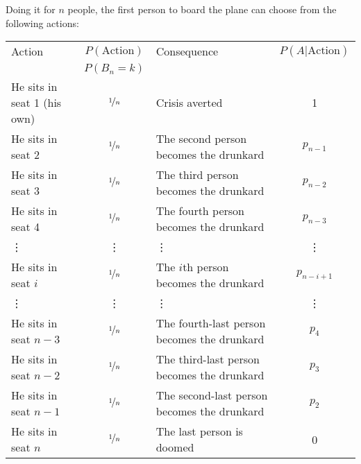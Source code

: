 \documentclass[a4paper]{article}
\begin{document}
Doing it for $n$ people, the first person to board the plane can choose from the following actions:
\begin{center}
\begin{tabular}{lclc}
\hline
 Action                    & $P(\text{Action})$ &  Consequence                             & $P(A|\text{Action})$ \\
                           & $P(B_n = k)$       &                                          &               \\
 \hline
He sits in seat 1 (his own)& $\nicefrac{1}{n}$  &  Crisis averted                          & 1\\
He sits in seat 2          & $\nicefrac{1}{n}$  &  The second person becomes the drunkard  & $p_{n-1}$\\
He sits in seat 3          & $\nicefrac{1}{n}$  &  The third person becomes the drunkard   & $p_{n-2}$\\
He sits in seat 4          & $\nicefrac{1}{n}$  &  The fourth person becomes the drunkard  & $p_{n-3}$\\
\vdots                     &   \vdots           &   \vdots                                 & \vdots \\
He sits in seat $i$        & $\nicefrac{1}{n}$  &  The $i$th person becomes the drunkard   & $p_{n-i+1}$\\
\vdots                     &   \vdots           &   \vdots                                 & \vdots \\
He sits in seat $n-3$      & $\nicefrac{1}{n}$  &  The fourth-last person becomes the drunkard & $p_{4}$\\
He sits in seat $n-2$      & $\nicefrac{1}{n}$  &  The third-last person becomes the drunkard & $p_{3}$\\
He sits in seat $n-1$      & $\nicefrac{1}{n}$  &  The second-last person becomes the drunkard & $p_{2}$\\
He sits in seat $n  $      & $\nicefrac{1}{n}$  &  The last person is doomed               & 0\\
\hline
\end{tabular}
\end{center}
\end{document}
